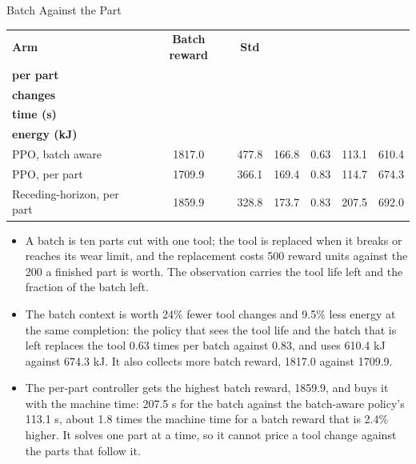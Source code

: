 ﻿\documentclass[11pt,aspectratio=169]{beamer}
\begin{document}
\begin{frame}{Batch Against the Part}
    \small
    \begin{center}
    \begin{tabular}{@{}lcccccc@{}}
    \toprule
    \textbf{Arm} & \textbf{Batch reward} & \textbf{Std} & \makecell{\textbf{Reward}\\\textbf{per part}} & \makecell{\textbf{Tool}\\\textbf{changes}} & \makecell{\textbf{Batch}\\\textbf{time (s)}} & \makecell{\textbf{Batch}\\\textbf{energy (kJ)}} \\
    \midrule
    PPO, batch aware & 1817.0 & 477.8 & 166.8 & \alert{0.63} & \alert{113.1} & \alert{610.4} \\
    PPO, per part & 1709.9 & 366.1 & 169.4 & 0.83 & 114.7 & 674.3 \\
    Receding-horizon, per part & \alert{1859.9} & 328.8 & 173.7 & 0.83 & 207.5 & 692.0 \\
    \bottomrule
    \end{tabular}
    \end{center}

    \vspace{0.4em}
    \footnotesize
    \begin{itemize}
        \item A batch is ten parts cut with one tool; the tool is replaced when it breaks or reaches
        its wear limit, and the replacement costs \alert{500 reward units against the 200 a finished
        part is worth}. The observation carries the tool life left and the fraction of the batch left.
        \item \alert{The batch context is worth 24\% fewer tool changes and 9.5\% less energy at the
        same completion}: the policy that sees the tool life and the batch that is left replaces the
        tool 0.63 times per batch against 0.83, and uses 610.4 kJ against 674.3 kJ. It also collects
        more batch reward, 1817.0 against 1709.9.
        \item The per-part controller gets the highest batch reward, 1859.9, and buys it with the
        machine time: \alert{207.5 s for the batch against the batch-aware policy's 113.1 s}, about 1.8
        times the machine time for a batch reward that is 2.4\% higher. It solves one part at a time,
        so it cannot price a tool change against the parts that follow it.
    \end{itemize}
\end{frame}
\end{document}
